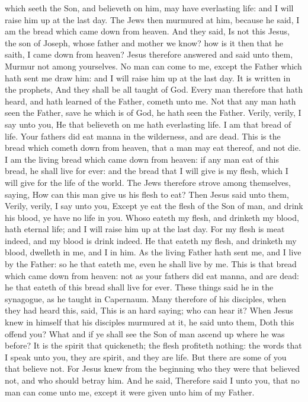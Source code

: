 which seeth the Son, and believeth on him, may have everlasting life:
and I will raise him up at the last day.  The Jews then
murmured at him, because he said, I am the bread which came down from
heaven.  And they said, Is not this Jesus, the son of
Joseph, whose father and mother we know? how is it then that he saith, I
came down from heaven?  Jesus therefore answered and said
unto them, Murmur not among yourselves.  No man can come
to me, except the Father which hath sent me draw him: and I will raise
him up at the last day.  It is written in the prophets,
And they shall be all taught of God. Every man therefore that hath
heard, and hath learned of the Father, cometh unto me. 
Not that any man hath seen the Father, save he which is of God, he hath
seen the Father.  Verily, verily, I say unto you, He that
believeth on me hath everlasting life.  I am that bread
of life.  Your fathers did eat manna in the wilderness,
and are dead.  This is the bread which cometh down from
heaven, that a man may eat thereof, and not die.  I am
the living bread which came down from heaven: if any man eat of this
bread, he shall live for ever: and the bread that I will give is my
flesh, which I will give for the life of the world.  The
Jews therefore strove among themselves, saying, How can this man give us
his flesh to eat?  Then Jesus said unto them, Verily,
verily, I say unto you, Except ye eat the flesh of the Son of man, and
drink his blood, ye have no life in you.  Whoso eateth my
flesh, and drinketh my blood, hath eternal life; and I will raise him up
at the last day.  For my flesh is meat indeed, and my
blood is drink indeed.  He that eateth my flesh, and
drinketh my blood, dwelleth in me, and I in him.  As the
living Father hath sent me, and I live by the Father: so he that eateth
me, even he shall live by me.  This is that bread which
came down from heaven: not as your fathers did eat manna, and are dead:
he that eateth of this bread shall live for ever.  These
things said he in the synagogue, as he taught in Capernaum.
 Many therefore of his disciples, when they had heard
this, said, This is an hard saying; who can hear it? 
When Jesus knew in himself that his disciples murmured at it, he said
unto them, Doth this offend you?  What and if ye shall
see the Son of man ascend up where he was before?  It is
the spirit that quickeneth; the flesh profiteth nothing: the words that
I speak unto you, they are spirit, and they are life. 
But there are some of you that believe not. For Jesus knew from the
beginning who they were that believed not, and who should betray him.
 And he said, Therefore said I unto you, that no man can
come unto me, except it were given unto him of my Father.

